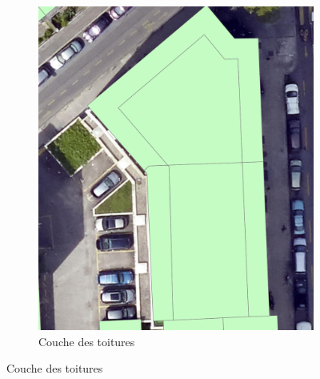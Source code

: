 \begin{figure}[H]
\begin{subfigure}[b]{0.48\textwidth}
        \includegraphics[width=\textwidth]{02-main/figures/ch3_piste_exploree_classification_08_resultats_image_toiture.png}
        \caption{Couche des toitures}
        \label{fig:ch3_piste_exploree_classification_08_resultats_image_toiture}
    \end{subfigure}
    
    \vspace{0.35cm} %
    

\end{figure}
